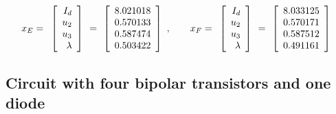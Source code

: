 \documentclass[conference,letterpaper,onecolumn]{IEEEtran}
\begin{document}
{
\begin{displaymath}
x_E=
\begin{array}{r}
\left[\begin{array}{r} I_d \\ u_2  \\ u_3  \\ \lambda  \\
\end{array}\right]
\begin{array}{r}
 \\ = \\ \\ \end{array}
\left[\begin{array}{r}
8.021018 \\
0.570133  \\
0.587474 \\
0.503422 \\
\end{array}\right]
\end{array} \\\\\\\\
, \qquad x_F=
\begin{array}{r}
\left[\begin{array}{r} I_d \\ u_2  \\ u_3  \\ \lambda  \\
\end{array}\right]
\begin{array}{r}
 \\ = \\ \\ \end{array}
\left[\begin{array}{r}
8.033125 \\
0.570171 \\
0.587512 \\
0.491161\\
\end{array}\right]
\end{array}
\end{displaymath}
}

\subsection{Circuit with four bipolar transistors and one diode}
\end{document}
